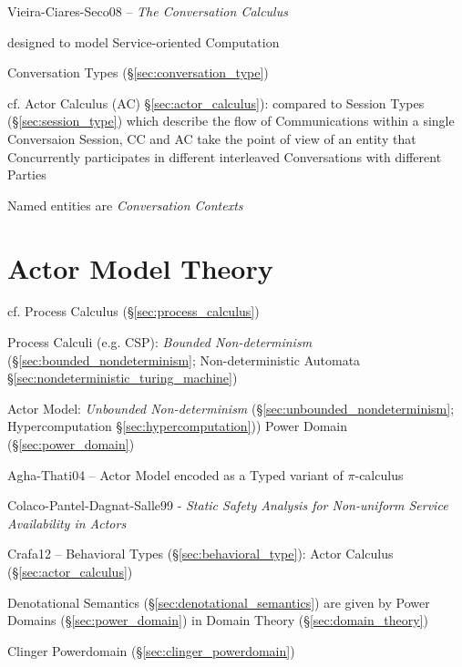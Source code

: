 Vieira-Ciares-Seco08 -- \emph{The Conversation Calculus}

designed to model Service-oriented Computation

\fist Conversation Types (\S\ref{sec:conversation_type})

\fist cf. Actor Calculus (AC) \S\ref{sec:actor_calculus}): compared to
Session Types (\S\ref{sec:session_type}) which describe the flow of
Communications within a single Conversaion Session, CC and AC take the
point of view of an entity that Concurrently participates in different
interleaved Conversations with different Parties

Named entities are \emph{Conversation Contexts}



\section{Actor Model Theory}\label{sec:actor_model}

\begingroup

\newcommand{\actord}{\xrightarrow{\approx}}
\newcommand{\arrord}[1]{\xrightarrow{#1}}
\newcommand{\cmbord}{\rightarrow}

\fist cf. Process Calculus (\S\ref{sec:process_calculus})

Process Calculi (e.g. CSP): \emph{Bounded Non-determinism}
(\S\ref{sec:bounded_nondeterminism}; \fist Non-deterministic Automata
\S\ref{sec:nondeterministic_turing_machine})

Actor Model: \emph{Unbounded Non-determinism}
(\S\ref{sec:unbounded_nondeterminism}; \fist Hypercomputation
\S\ref{sec:hypercomputation})) Power Domain (\S\ref{sec:power_domain})

Agha-Thati04 -- Actor Model encoded as a Typed variant of
$\pi$-calculus

Colaco-Pantel-Dagnat-Salle99 - \emph{Static Safety Analysis for
  Non-uniform Service Availability in Actors}

Crafa12 -- Behavioral Types (\S\ref{sec:behavioral_type}): Actor
Calculus (\S\ref{sec:actor_calculus})

Denotational Semantics (\S\ref{sec:denotational_semantics}) are given
by Power Domains (\S\ref{sec:power_domain}) in Domain Theory
(\S\ref{sec:domain_theory})

Clinger Powerdomain (\S\ref{sec:clinger_powerdomain})

